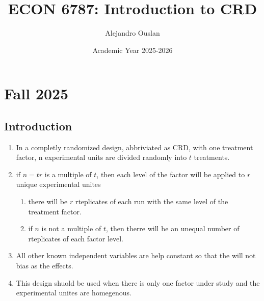 \documentclass[10pt, oneside]{article}
\title{ECON 6787: Introduction to CRD}
\author{Alejandro Ouslan}
\date{Academic Year 2025-2026}
\begin{document}
\maketitle
\tableofcontents

\vspace{.25in}

\section{Fall 2025}

\subsection{Introduction}

\begin{enumerate}
	\item In a completly randomized design, abbriviated as CRD, with one treatment
	      factor, n experimental units are divided randomly into $t$ treatments.
	\item if $n = tr$ is a multiple of $t$, then each level of the factor will be applied to $r$
	      unique experimental unites
	      \begin{enumerate}
		      \item there will be $r$ rteplicates of each run with the same level of the treatment factor.
		      \item if $n$ is not a multiple of $t$, then therre will be an unequal number of rteplicates
		            of each factor level.
	      \end{enumerate}
	\item All other known independent variables are help constant so that the will not bias as the effects.
	\item This design shuold be used when there is only one factor under study and the experimental unites are
	      homegenous.


\end{enumerate}
\end{document}
